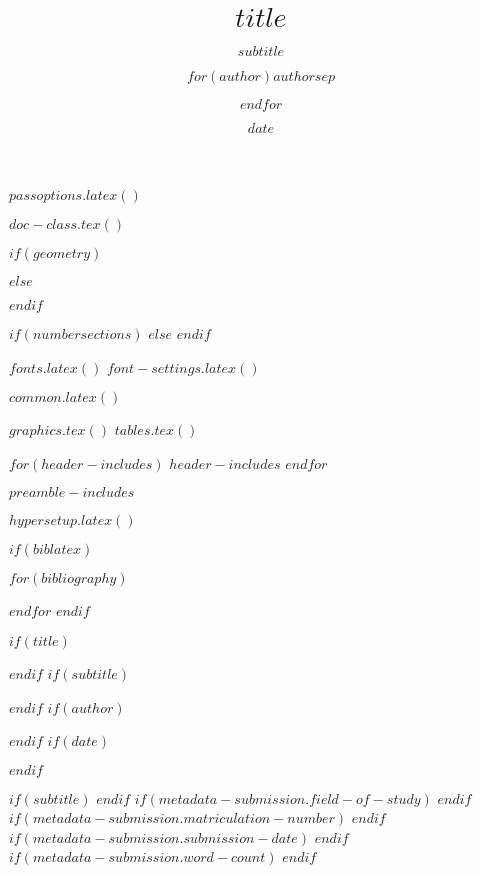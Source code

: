 $passoptions.latex()$

$doc-class.tex()$

\usepackage{xcolor}

$if(geometry)$
\usepackage[$for(geometry)$$geometry$$sep$,$endfor$]{geometry}
$else$
\usepackage[a4paper,margin=2.5cm]{geometry}
$endif$

\usepackage{amsmath,amssymb}

$if(numbersections)$
\setcounter{secnumdepth}{$if(secnumdepth)$$secnumdepth$$else$5$endif$}
$else$
\setcounter{secnumdepth}{-\maxdimen}
$endif$

$fonts.latex()$
$font-settings.latex()$

$common.latex()$

$graphics.tex()$
$tables.tex()$

\usepackage{hyperref}
\usepackage{cleveref}

$for(header-includes)$
$header-includes$
$endfor$

$preamble-includes$

$hypersetup.latex()$

$if(biblatex)$
\usepackage[$if(biblio-style)$style=$biblio-style$,$endif$$for(biblatexoptions)$$biblatexoptions$$sep$,$endfor$]{biblatex}
$for(bibliography)$

$endfor$
$endif$

$if(title)$
\title{$title$}
$endif$
$if(subtitle)$
\subtitle{$subtitle$}
$endif$
$if(author)$
\author{$for(author)$$author$$sep$ \and $endfor$}
$endif$
$if(date)$
\date{$date$}
$endif$

$if(subtitle)$
\newcommand{\thesubtitle}{$subtitle$}
$endif$
$if(metadata-submission.field-of-study)$
\newcommand{\fieldofstudy}{$metadata-submission.field-of-study$}
$endif$
$if(metadata-submission.matriculation-number)$
\newcommand{\matriculationnumber}{$metadata-submission.matriculation-number$}
$endif$
$if(metadata-submission.submission-date)$
\newcommand{\submissiondate}{$metadata-submission.submission-date$}
$endif$
$if(metadata-submission.word-count)$
\newcommand{\wordcount}{$metadata-submission.word-count$}
$endif$

